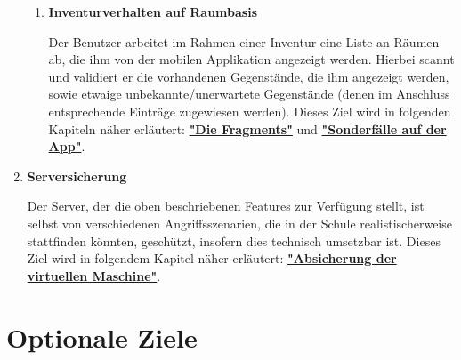 \documentclass[
    headings=optiontotocandhead,%
    twoside,
    numbers=noenddot,%
    toc=flat, %
    12pt, %
    titlepage, %
    parskip=full, %
    listof=totoc, %
    listof=flat, %
    numbers=noenddot, %
    bibliography=totoc, %
    a4paper,DIV=14,
    BCOR=15mm,
]{scrbook}
\begin{document}
\begin{enumerate}
\begin{enumerate}
        \item	\textbf{Inventurverhalten auf Raumbasis}

        Der Benutzer arbeitet im Rahmen einer Inventur eine Liste an Räumen ab, die ihm von der mobilen Applikation angezeigt werden. Hierbei scannt und validiert er die vorhandenen Gegenstände, die ihm angezeigt werden, sowie etwaige unbekannte/unerwartete Gegenstände (denen im Anschluss entsprechende Einträge zugewiesen werden).
        Dieses Ziel wird in folgenden Kapiteln näher erläutert:  \textbf{\hyperref[die-fragments]{"Die Fragments"}} und \textbf{\hyperref[sonderfuxe4lle-auf-der-app]{"Sonderfälle auf der App"}}.
      \end{enumerate}

        \item \textbf{Serversicherung}

        Der Server, der die oben beschriebenen Features zur Verfügung stellt, ist selbst von verschiedenen Angriffsszenarien, die in der Schule realistischerweise stattfinden könnten, geschützt, insofern dies technisch umsetzbar ist. 
        Dieses Ziel wird in folgendem Kapitel näher erläutert: \textbf{\hyperref[absicherung-der-virtuellen-maschine]{"Absicherung der virtuellen Maschine"}}.
    
\end{enumerate}



\section{Optionale Ziele}
\end{document}

